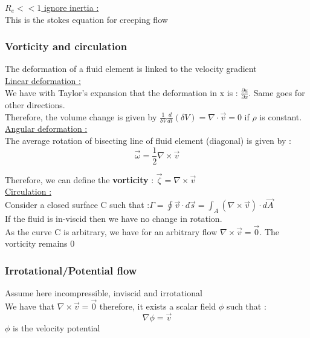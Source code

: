 \documentclass[../main.tex]{subfiles}
\begin{document}
\underline{$R_e<<1$ ignore inertia :}\\
This is the stokes equation for creeping flow\\

\subsubsection{Vorticity and circulation}
The deformation of a fluid element is linked to the velocity gradient\\

\quad \underline{Linear deformation :}\\
We have with Taylor's expansion that the deformation in x is : $\frac{\partial u}{\partial x}$. Same goes for other directions.\\
Therefore, the volume change is given by $\frac{1}{\delta V} \frac{d}{dt} (\delta V) = \nabla \cdot \Vec{v} = 0$ if $\rho$ is constant.\\

\quad \underline{Angular deformation :}\\
The average rotation of bisecting line of fluid element (diagonal) is given by :\begin{equation}
    \Vec{\omega} = \frac{1}{2} \nabla \times \Vec{v}
\end{equation}

Therefore, we can define the \textbf{vorticity} : $\Vec{\zeta} = \nabla \times \Vec{v}$\\

\quad \underline{Circulation :}\\

Consider a closed surface C such that :$\Gamma = \oint \Vec{v}\cdot d\Vec{s} = \int_A (\nabla \times \Vec{v})\cdot d\Vec{A}$\\

If the fluid is in-viscid then we have no change in rotation. \\
As the curve C is arbitrary, we have for an arbitrary flow $\nabla \times \Vec{v} = \Vec{0}$. The vorticity remains 0\\

\subsubsection{Irrotational/Potential flow}
Assume here incompressible, inviscid and irrotational\\
We have that $\nabla \times \Vec{v} = \Vec{0}$ therefore, it exists a scalar field $\phi$ such that :\begin{equation}
    \nabla \phi = \Vec{v}
\end{equation}
$\phi$ is the velocity potential\\
\end{document}
